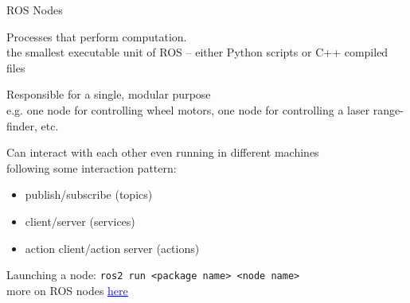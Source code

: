 \documentclass[compress]{beamer}
\begin{document}
\begin{frame}{ROS Nodes}

   \footnotesize

   Processes that perform computation.\\  
   {\tiny the smallest executable unit of ROS -- either Python scripts or C++ compiled files}
   
   \vspace{0.5cm}
   
   
   
   Responsible for a single, modular purpose\\
   {\tiny e.g. one node for controlling wheel motors, one node for controlling a laser range-finder, etc.} 
   
   \vspace{0.5cm}
   
   
  \footnotesize
   
   Can interact with each other {\tiny even running in different machines}\\
   following some interaction pattern:\\
   \vspace{-.5cm}
   \begin{itemize}\ssmall
    \item publish/subscribe (topics)
    \item client/server (services)
    \item action client/action server (actions)
   \end{itemize}

   
   \vspace{.5cm}
   
   Launching a node:   \texttt{ros2 run <package name> <node name>}\\

   
    \vfill
    {\fontsize{4}{4.8}\selectfont more on ROS nodes \href{https://docs.ros.org/en/foxy/Tutorials/Beginner-CLI-Tools/Understanding-ROS2-Nodes/Understanding-ROS2-Nodes.html}{\textcolor{blue}{\underline{here}}}}
 
   
\end{frame}
\end{document}
